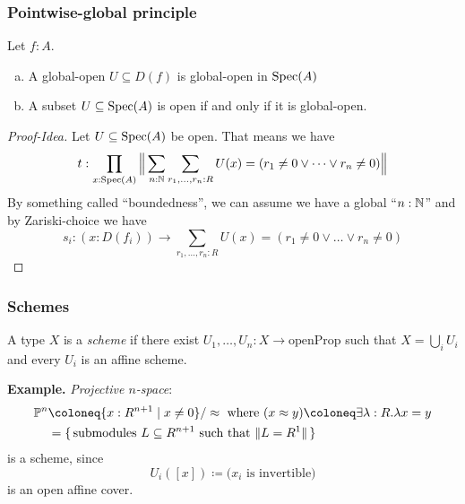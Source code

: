 \documentclass{beamer}
\begin{document}
\begin{frame}
  \frametitle{Pointwise-global principle}
  \begin{theorem}
    Let $f:A$.
    \begin{enumerate}[(a)]
    \item A global-open $U\subseteq D(f)$ is global-open in $\operatorname{Spec}(A)$
    \item A subset $U\subseteq \operatorname{Spec}(A)$ is open if and only if it is global-open.
    \end{enumerate}
  \end{theorem}
  \begin{proof}[Proof-Idea]
    Let $U\subseteq \operatorname{Spec}(A)$ be open. 
    \pause
    That means we have
    \[
      t:\prod_{x:\operatorname{Spec}(A)}\Big\|\sum_{n:\mathbb{N}} \sum_{r_1,\dots,r_n:R}U(x)=(r_1\neq 0\vee\dots\vee r_n\neq 0)\Big\|
    \]
    By something called ``boundedness'', we can assume we have a global ``$n:\mathbb{N}$'' and by Zariski-choice we have
    \[
      s_i:(x:D(f_i))\to \sum_{r_1,\dots,r_n:R}U(x)=(r_1\neq 0\vee\dots\vee r_n\neq 0)
    \]
  \end{proof}
\end{frame}

\begin{frame}
  \frametitle{Schemes}
  A type $X$ is a \emph{scheme} if
  there exist $U_1, \dots, U_n : X \to \mathrm{openProp}$
  such that $X = \bigcup_i U_i$
  and every $U_i$ is an affine scheme.

  \pause
  \vspace{5mm}
  \textbf{Example.}
  \emph{Projective $n$-space}:
  \begin{align*}
    \bP^n
    &\coloneq \{x : R^{n+1}\mid x\neq 0\}/\approx\text{ where $(x\approx y)\coloneq \exists \lambda:R. \lambda x= y$} \\
    &= \{\,\text{submodules $L\subseteq R^{n+1}$ such that $\|L=R^1\|$}\,\}
  \end{align*}
  is a scheme, since
  \[
    U_i([x]) \coloneq \text{($x_i$ is invertible)}
  \]
  is an open affine cover.
\end{frame}
\end{document}
